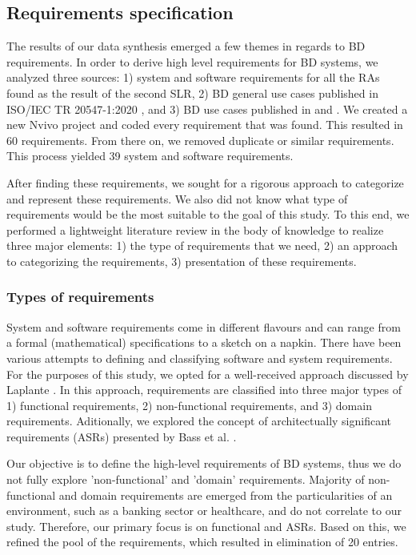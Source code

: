 \documentclass{bmcart}
\begin{document}
\subsection{Requirements specification} \label{requirementSpec}

The results of our data synthesis emerged a few themes in regards to BD requirements. In order to derive high level requirements for BD systems, we analyzed three sources: 1) system and software requirements for all the RAs found as the result of the second SLR, 2) BD general use cases published in ISO/IEC TR 20547-1:2020 \cite{ISO20547}, and 3) BD use cases published in \cite{fox2014big} and \cite{golzer2015data}. We created a new Nvivo project and coded every requirement that was found. This resulted in 60 requirements. From there on, we removed duplicate or similar requirements. This process yielded 39 system and software requirements.

After finding these requirements, we sought for a rigorous approach to categorize and represent these requirements. We also did not know what type of requirements would be the most suitable to the goal of this study. To this end, we performed a lightweight literature review in the body of knowledge to realize three major elements: 1) the type of requirements that we need, 2) an approach to categorizing the requirements, 3) presentation of these requirements. 

\subsubsection{Types of requirements}
System and software requirements come in different flavours and can range from a formal (mathematical) specifications to a sketch on a napkin. There have been various attempts to defining and classifying software and system requirements. For the purposes of this study, we opted for a well-received approach discussed by Laplante \cite{laplante2017requirements}. In this approach, requirements are classified into three major types of 1) functional requirements, 2) non-functional requirements, and 3) domain requirements. Aditionally, we explored the concept of architectually significant requirements (ASRs) presented by Bass et al. \cite{SoftwareArchitectureKazman}. 

Our objective is to define the high-level requirements of BD systems, thus we do not fully explore 'non-functional' and 'domain' requirements. Majority of non-functional and domain requirements are emerged from the particularities of an environment, such as a banking sector or healthcare, and do not correlate to our study. Therefore, our primary focus is on functional and ASRs. Based on this, we refined the pool of the requirements, which resulted in elimination of 20 entries. 
\end{document}
